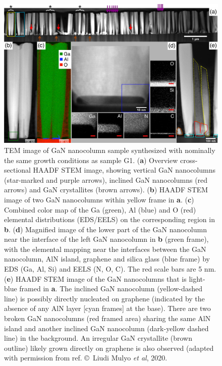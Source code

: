 \begin{figure} %
    \centering
    \includegraphics[width=\textwidth]{figures/paper-iv/fig-5.png}
    \caption[TEM image of GaN nanocolumn sample synthesized with\newline nominally the same growth conditions as sample G1]{TEM image of GaN nanocolumn sample synthesized with nominally the same growth conditions as sample G1. (\textbf{a}) Overview cross-sectional HAADF STEM image, showing vertical GaN nanocolumns (star-marked and purple arrows), inclined GaN nanocolumns (red arrows) and GaN crystallites (brown arrows). (\textbf{b}) HAADF STEM image of two GaN nanocolumns within yellow frame in \textbf{a}. (\textbf{c}) Combined color map of the Ga (green), Al (blue) and O (red) elemental distributions (EDS/EELS) on the corresponding region in \textbf{b}. (\textbf{d}) Magnified image of the lower part of the GaN nanocolumn near the interface of the left GaN nanocolumn in \textbf{b} (green frame), with the elemental mapping near the interfaces between the GaN nanocolumn, AlN island, graphene and silica glass (blue frame) by EDS (Ga, Al, Si) and EELS (N, O, C). The red scale bars are 5 nm. (\textbf{e}) HAADF STEM image of the GaN nanocolumns that is light-blue framed in \textbf{a}. The inclined GaN nanocolumn (yellow-dashed line) is possibly directly nucleated on graphene (indicated by the absence of any AlN layer [cyan frames] at the base). There are two broken GaN nanocolumns (red framed area) sharing the same AlN island and another inclined GaN nanocolumn (dark-yellow dashed line) in the background. An irregular GaN crystallite (brown outline) likely grown directly on graphene is also observed (adapted with permission from ref.  \copyright \ Liudi Mulyo \textit{et al}, 2020.}
    \label{fig:figures/paper-iv/fig-5}
\end{figure}

